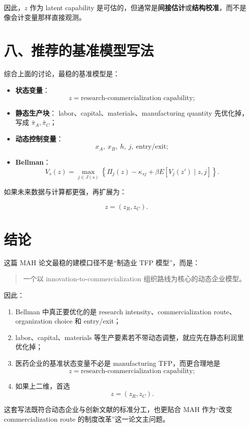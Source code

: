 \documentclass[12pt]{ctexart}
\begin{document}
因此，\(z\) 作为 latent capability 是可估的，但通常是\textbf{间接估计}或\textbf{结构校准}，而不是像会计变量那样直接观测。

\section{八、推荐的基准模型写法}

综合上面的讨论，最稳的基准模型是：

\begin{itemize}[leftmargin=2em]
    \item \textbf{状态变量}：
    \[
    z=\text{research-commercialization capability};
    \]
    \item \textbf{静态生产块}：
    labor、capital、materials、manufacturing quantity 先优化掉，写成 \(\bar{\pi}_A,\bar{\pi}_C\)；
    \item \textbf{动态控制变量}：
    \[
    x_A,\ x_B,\ h,\ j,\ \text{entry/exit};
    \]
    \item \textbf{Bellman}：
    \[
    V_s(z)=\max_{j\in J(s)}
    \left\{
    \Pi_j(z)-\kappa_{sj}+\beta E[V_j(z')\mid z,j]
    \right\}.
    \]
\end{itemize}

如果未来数据与计算都更强，再扩展为：

\[
z=(z_R,z_C).
\]

\section{结论}

这篇 MAH 论文最稳的建模口径不是“制造业 TFP 模型”，而是：

\begin{quote}
一个以 innovation-to-commercialization 组织路线为核心的动态企业模型。
\end{quote}

因此：

\begin{enumerate}[leftmargin=2em]
    \item Bellman 中真正要优化的是 research intensity、commercialization route、organization choice 和 entry/exit；
    \item labor、capital、materials 等生产要素若不带动态调整，就应先在静态利润里优化掉；
    \item 医药企业的基准状态变量不必是 manufacturing TFP，而更合理地是
    \[
    z=\text{research-commercialization capability};
    \]
    \item 如果上二维，首选
    \[
    z=(z_R,z_C).
    \]
\end{enumerate}

这套写法既符合动态企业与创新文献的标准分工，也更贴合 MAH 作为“改变 commercialization route 的制度改革”这一论文主问题。
\end{document}
